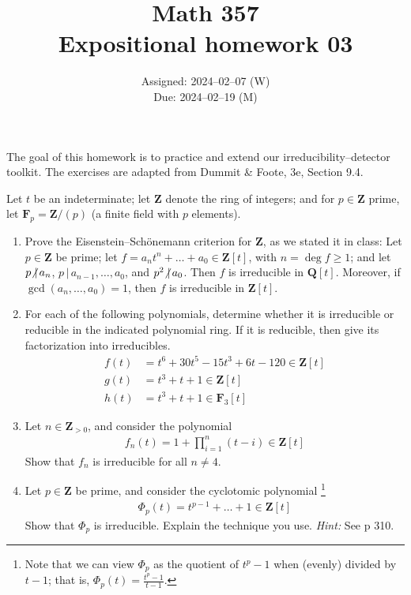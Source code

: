 \documentclass[oneside, english, 11pt]{article}
\title{Math 357\\Expositional homework 03}
\author{}
\date{Assigned: 2024--02--07 (W)\\\hspace{0.37in}Due: 2024--02--19 (M)}
\newcommand{\fontHint}[1]{\emph{Hint:} #1}
\newcommand{\divides}{\,|\,}
\newcommand{\F}{\mathbf{F}}
\newcommand{\integers}{\mathbf{Z}}
\newcommand{\integersPositive}{\integers_{> 0}}
\newcommand{\notDivides}{{}\hspace{-1mm}\not\hspace{-.15em}\divides{}}
\newcommand{\Q}{\rationals}
\newcommand{\rationals}{\mathbf{Q}}
\newcommand{\Z}{\integers}
\begin{document}
\maketitle

The goal of this homework is to practice and extend our irreducibility--detector toolkit. The exercises are adapted from Dummit \&{} Foote, 3e, Section 9.4.

Let $t$ be an indeterminate; let $\Z$ denote the ring of integers; and for $p \in \Z$ prime, let $\F_{p} = \Z / (p)$ (a finite field with $p$ elements).

\begin{enumerate}[label=(\alph*)]
\item\label{itm : EH03a} Prove the Eisenstein--Sch\"{o}nemann criterion for $\Z$, as we stated it in class: Let $p \in \Z$ be prime; let $f = a_{n} t^{n} + \ldots + a_{0} \in \Z[t]$, with $n = \deg f \geq 1$; and let $p \notDivides a_{n}$, $p \divides a_{n - 1}, \ldots, a_{0}$, and $p^{2} \notDivides a_{0}$. Then $f$ is irreducible in $\Q[t]$. Moreover, if $\gcd(a_{n}, \ldots, a_{0}) = 1$, then $f$ is irreducible in $\Z[t]$.

\item\label{itm : EH03b} For each of the following polynomials, determine whether it is irreducible or reducible in the indicated polynomial ring. If it is reducible, then give its factorization into irreducibles.
\begin{align*}
f(t)
&=
t^{6} + 30 t^{5} - 15 t^{3} + 6 t - 120 \in \Z[t]
\\
g(t)
&=
t^{3} + t + 1 \in \Z[t]
\\
h(t)
&=
t^{3} + t + 1 \in \F_{3}[t]
\end{align*}

\item\label{itm : EH03c} Let $n \in \integersPositive$, and consider the polynomial
\begin{align*}
f_{n}(t)
=
1 + \prod_{i = 1}^{n} (t - i)
\in
\Z[t]
\end{align*}
Show that $f_{n}$ is irreducible for all $n \neq 4$.

\item\label{itm : EH03d} Let $p \in \Z$ be prime, and consider the cyclotomic polynomial%
\footnote{Note that we can view $\Phi_{p}$ as the quotient of $t^{p} - 1$ when (evenly) divided by $t - 1$; that is, $\Phi_{p}(t) = \frac{t^{p} - 1}{t - 1}$.}%
\begin{align*}
\Phi_{p}(t)
=
t^{p - 1} + \ldots + 1
\in
\Z[t]
\end{align*}
Show that $\Phi_{p}$ is irreducible. Explain the technique you use. \fontHint{See p 310.}


\end{enumerate}
\end{document}
